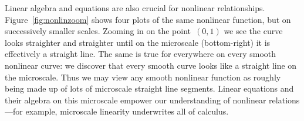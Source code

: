 Linear algebra and equations are also crucial for nonlinear relationships.
Figure~\ref{fig:nonlinzoom} shows four plots of the same nonlinear function, but on successively smaller scales.
Zooming in on the point~\((0,1)\) we see the curve looks straighter and straighter until on the microscale (bottom-right) it is effectively a straight line.
The same is true for everywhere on every smooth nonlinear curve: we discover that every smooth curve looks like a straight line on the microscale. 
Thus we may view any smooth nonlinear function as roughly being made up of lots of microscale straight line segments.
Linear equations and their algebra on this microscale empower our understanding of nonlinear relations---for example, microscale linearity underwrites all of calculus.
 




\endinput





